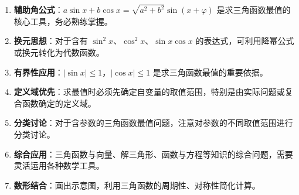 \documentclass[11pt]{ctexrep}
\begin{document}
\begin{enumerate}
    \item \textbf{辅助角公式}：$a\sin x + b\cos x = \sqrt{a^2 + b^2}\sin(x + \varphi)$ 是求三角函数最值的核心工具，务必熟练掌握。
    \item \textbf{换元思想}：对于含有 $\sin^2 x$、$\cos^2 x$、$\sin x\cos x$ 的表达式，可利用降幂公式或换元转化为代数函数。
    \item \textbf{有界性应用}：$|\sin x| \leqslant 1$，$|\cos x| \leqslant 1$ 是求三角函数最值的重要依据。
    \item \textbf{定义域优先}：求最值时必须先确定自变量的取值范围，特别是由实际问题或复合函数确定的定义域。
    \item \textbf{分类讨论}：对于含参数的三角函数最值问题，注意对参数的不同取值范围进行分类讨论。
    \item \textbf{综合应用}：三角函数与向量、解三角形、函数与方程等知识的综合问题，需要灵活运用各种数学工具。
    \item \textbf{数形结合}：画出示意图，利用三角函数的周期性、对称性简化计算。
\end{enumerate}
\end{document}
